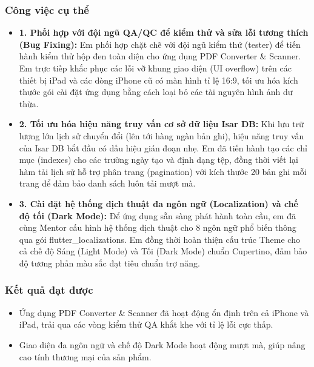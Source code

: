 \documentclass[12pt, a4paper]{article}
\begin{document}
\subsubsection{Công việc cụ thể}
\begin{itemize}
    \item \textbf{1. Phối hợp với đội ngũ QA/QC để kiểm thử và sửa lỗi tương thích (Bug Fixing):}
    Em phối hợp chặt chẽ với đội ngũ kiểm thử (tester) để tiến hành kiểm thử hộp đen toàn diện cho ứng dụng PDF Converter \& Scanner. Em trực tiếp khắc phục các lỗi vỡ khung giao diện (UI overflow) trên các thiết bị iPad và các dòng iPhone cũ có màn hình tỉ lệ 16:9, tối ưu hóa kích thước gói cài đặt ứng dụng bằng cách loại bỏ các tài nguyên hình ảnh dư thừa.
    
    \item \textbf{2. Tối ưu hóa hiệu năng truy vấn cơ sở dữ liệu Isar DB:}
    Khi lưu trữ lượng lớn lịch sử chuyển đổi (lên tới hàng ngàn bản ghi), hiệu năng truy vấn của Isar DB bắt đầu có dấu hiệu gián đoạn nhẹ. Em đã tiến hành tạo các chỉ mục (indexes) cho các trường ngày tạo và định dạng tệp, đồng thời viết lại hàm tải lịch sử hỗ trợ phân trang (pagination) với kích thước 20 bản ghi mỗi trang để đảm bảo danh sách luôn tải mượt mà.
    
    \item \textbf{3. Cài đặt hệ thống dịch thuật đa ngôn ngữ (Localization) và chế độ tối (Dark Mode):}
    Để ứng dụng sẵn sàng phát hành toàn cầu, em đã cùng Mentor cấu hình hệ thống dịch thuật cho 8 ngôn ngữ phổ biến thông qua gói flutter\_localizations. Em đồng thời hoàn thiện cấu trúc Theme cho cả chế độ Sáng (Light Mode) và Tối (Dark Mode) chuẩn Cupertino, đảm bảo độ tương phản màu sắc đạt tiêu chuẩn trợ năng.
\end{itemize}
\subsubsection{Kết quả đạt được}
\begin{itemize}
    \item Ứng dụng PDF Converter \& Scanner đã hoạt động ổn định trên cả iPhone và iPad, trải qua các vòng kiểm thử QA khắt khe với tỉ lệ lỗi cực thấp.
    \item Giao diện đa ngôn ngữ và chế độ Dark Mode hoạt động mượt mà, giúp nâng cao tính thương mại của sản phẩm.
\end{itemize}
\end{document}
